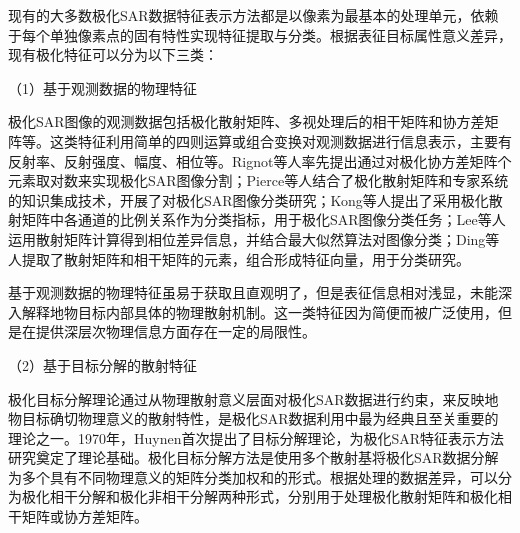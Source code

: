 
现有的大多数极化SAR数据特征表示方法都是以像素为最基本的处理单元，依赖于每个单独像素点的固有特性实现特征提取与分类。根据表征目标属性意义差异，现有极化特征可以分为以下三类：

（1）基于观测数据的物理特征

极化SAR图像的观测数据包括极化散射矩阵、多视处理后的相干矩阵和协方差矩阵等。这类特征利用简单的四则运算或组合变换对观测数据进行信息表示，主要有反射率、反射强度、幅度、相位等。Rignot等人率先提出通过对极化协方差矩阵个元素取对数来实现极化SAR图像分割；Pierce等人结合了极化散射矩阵和专家系统的知识集成技术，开展了对极化SAR图像分类研究；Kong等人提出了采用极化散射矩阵中各通道的比例关系作为分类指标，用于极化SAR图像分类任务；Lee等人运用散射矩阵计算得到相位差异信息，并结合最大似然算法对图像分类；Ding等人提取了散射矩阵和相干矩阵的元素，组合形成特征向量，用于分类研究。

基于观测数据的物理特征虽易于获取且直观明了，但是表征信息相对浅显，未能深入解释地物目标内部具体的物理散射机制。这一类特征因为简便而被广泛使用，但是在提供深层次物理信息方面存在一定的局限性。


（2）基于目标分解的散射特征

极化目标分解理论通过从物理散射意义层面对极化SAR数据进行约束，来反映地物目标确切物理意义的散射特性，是极化SAR数据利用中最为经典且至关重要的理论之一。1970年，Huynen首次提出了目标分解理论，为极化SAR特征表示方法研究奠定了理论基础。极化目标分解方法是使用多个散射基将极化SAR数据分解为多个具有不同物理意义的矩阵分类加权和的形式。根据处理的数据差异，可以分为极化相干分解和极化非相干分解两种形式，分别用于处理极化散射矩阵和极化相干矩阵或协方差矩阵。

